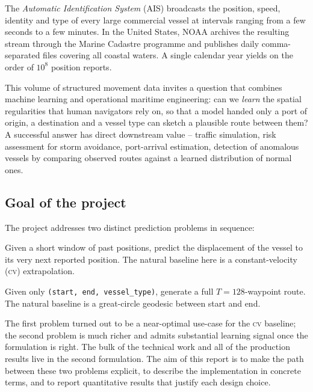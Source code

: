 \documentclass[11pt,a4paper]{article}
\begin{document}
The \emph{Automatic Identification System} (AIS) broadcasts the position,
speed, identity and type of every large commercial vessel at intervals
ranging from a few seconds to a few minutes.
In the United States, NOAA archives the resulting stream through the
Marine Cadastre programme and publishes daily comma-separated files
covering all coastal waters.
A single calendar year yields on the order of $10^8$ position reports.

This volume of structured movement data invites a question that
combines machine learning and operational maritime engineering: can we
\emph{learn} the spatial regularities that human navigators rely on, so
that a model handed only a port of origin, a destination and a vessel
type can sketch a plausible route between them?
A successful answer has direct downstream value -- traffic simulation,
risk assessment for storm avoidance, port-arrival estimation,
detection of anomalous vessels by comparing observed routes against a
learned distribution of normal ones.

\subsection{Goal of the project}

The project addresses two distinct prediction problems in sequence:

\begin{description}[leftmargin=*,style=nextline]
  \item[Next-step prediction (v1).]
  Given a short window of past positions, predict the displacement of
  the vessel to its very next reported position. The natural baseline
  here is a constant-velocity (\textsc{cv}) extrapolation.
  \item[Conditional full-route generation (v2 onward).]
  Given only \texttt{(start, end, vessel\_type)}, generate a full
  $T = 128$-waypoint route. The natural baseline is a great-circle
  geodesic between start and end.
\end{description}

The first problem turned out to be a near-optimal use-case for the
\textsc{cv} baseline; the second problem is much richer and admits
substantial learning signal once the formulation is right.
The bulk of the technical work and all of the production results live
in the second formulation.
The aim of this report is to make the path between these two problems
explicit, to describe the implementation in concrete terms, and to
report quantitative results that justify each design choice.
\end{document}

